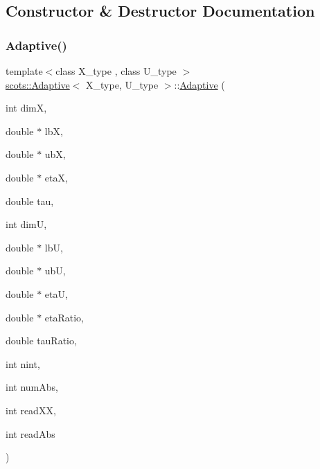 \subsection{Constructor \& Destructor Documentation}
\mbox{\label{classscots_1_1Adaptive_a7a6ba80b2a6679ec1194551be3dee698}} 
\subsubsection{\texorpdfstring{Adaptive()}{Adaptive()}}
{\footnotesize\ttfamily template$<$class X\+\_\+type , class U\+\_\+type $>$ \\
\hyperlink{classscots_1_1Adaptive}{scots\+::\+Adaptive}$<$ X\+\_\+type, U\+\_\+type $>$\+::\hyperlink{classscots_1_1Adaptive}{Adaptive} (\begin{DoxyParamCaption}\item[{int}]{dimX,  }\item[{double $\ast$}]{lbX,  }\item[{double $\ast$}]{ubX,  }\item[{double $\ast$}]{etaX,  }\item[{double}]{tau,  }\item[{int}]{dimU,  }\item[{double $\ast$}]{lbU,  }\item[{double $\ast$}]{ubU,  }\item[{double $\ast$}]{etaU,  }\item[{double $\ast$}]{eta\+Ratio,  }\item[{double}]{tau\+Ratio,  }\item[{int}]{nint,  }\item[{int}]{num\+Abs,  }\item[{int}]{read\+XX,  }\item[{int}]{read\+Abs }\end{DoxyParamCaption})\hspace{0.3cm}{\ttfamily [inline]}}

